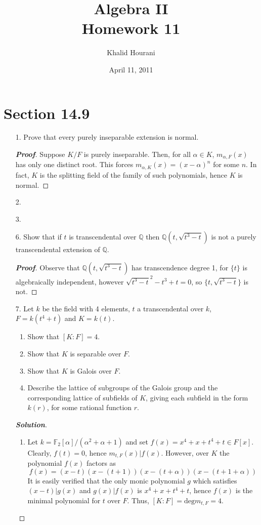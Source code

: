 \documentclass[12pt,leqno]{article}
\title{Algebra II\\\large Homework 11}
\date{April 11, 2011}
\author{Khalid Hourani}
\theoremstyle{definition}
\newcommand{\Q}{\mathbb{Q}}
\newcommand{\F}{\mathbb{F}}
\newcommand{\+}{\oplus}
\newenvironment{Proof}{\begin{proof}[\textnormal{\textbf{Proof}}]}{\end{proof}}
\newenvironment{Solution}{\begin{proof}[\textnormal{\textbf{Solution}}]}{\end{proof}}
\begin{document}
 \begin{titlepage}
  \maketitle
 \end{titlepage}

\section*{Section 14.9}
  \begin{enumerate}
   \item [1.] Prove that every purely inseparable extension is normal.
   \begin{Proof}
   Suppose $K/F$ is purely inseparable. Then, for all $\alpha\in K$, $m_{\alpha,F}(x)$ has only one distinct root. This forces $m_{\alpha,K}(x)=(x-\alpha)^n$ for some $n$. In fact, $K$ is the splitting field of the family of such polynomials, hence $K$ is normal.
   \end{Proof}
   \item [2.] 
   \item [3.]
   \item [6.] Show that if $t$ is transcendental over $\Q$ then $\Q(t,\sqrt{t^3-t})$ is not a purely transcendental extension of $\Q$.
   	\begin{Proof}
   	Observe that $\Q(t,\sqrt{t^3-t})$ has transcendence degree 1, for $\{t\}$ is algebraically independent, however $\sqrt{t^3-t}^2-t^3+t=0$, so $\{t,\sqrt{t^3-t}\}$ is not. 
   	\end{Proof}
   \item [7.] Let $k$ be the field with 4 elements, $t$ a transcendental over $k$, $F=k(t^4+t)$ and $K=k(t)$.
   	\begin{enumerate}
			\item Show that $[K:F]=4$. 
			\item Show that $K$ is separable over $F$.
			\item Show that $K$ is Galois over $F$.
			\item Describe the lattice of subgroups of the Galois group and the corresponding lattice of subfields of $K$, giving each subfield in the form $k(r)$, for some rational function $r$.
\end{enumerate}
	\begin{Solution}\indent
	\begin{enumerate}
	\item Let $k=\F_2[\alpha]/(\alpha^2+\alpha+1)$ and set $f(x)=x^4+x+t^4+t\in F[x]$. Clearly, $f(t)=0$, hence $m_{t,F}(x)|f(x)$. However, over $K$ the polynomial $f(x)$ factors as \[f(x)=(x-t)(x-(t+1))(x-(t+\alpha))(x-(t+1+\alpha))\] It is easily verified that the only monic polynomial $g$ which satisfies $(x-t)|g(x)$ and $g(x)|f(x)$ is $x^4+x+t^4+t$, hence $f(x)$ is the minimal polynomial for $t$ over $F$. Thus, $[K:F]=\text{deg}m_{t,F}=4$.

\end{enumerate}
\end{Solution}
\end{enumerate}
\end{document}
